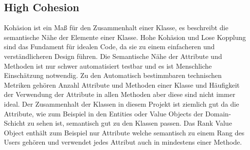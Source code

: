 \subsection{High Cohesion}
Kohäsion ist ein Maß für den Zusammenhalt einer Klasse, es beschreibt die semantische Nähe der Elemente einer Klasse.
Hohe Kohäsion und Lose Kopplung sind das Fundament für idealen Code, da sie zu einem einfacheren und verständlicheren Design führen.
Die Semantische Nähe der Attribute und Methoden ist nur schwer automatisiert testbar und es ist Menschliche Einschätzung notwendig.
Zu den Automatisch bestimmbaren technischen Metriken gehören Anzahl Attribute und Methoden einer Klasse und Häufigkeit der Verwendung der Attribute in allen Methoden aber diese sind nicht immer ideal.
Der Zusammenhalt der Klassen in diesem Projekt ist ziemlich gut da die Attribute, wie zum Beispiel in den Entities oder Value Objects der Domain-Schicht zu sehen ist, semantisch gut zu den Klassen passen.
Das Rank Value Object enthält zum Beispiel nur Attribute welche semantisch zu einem Rang des Users gehören und verwendet jedes Attribut auch in mindestens einer Methode.
\newpage
